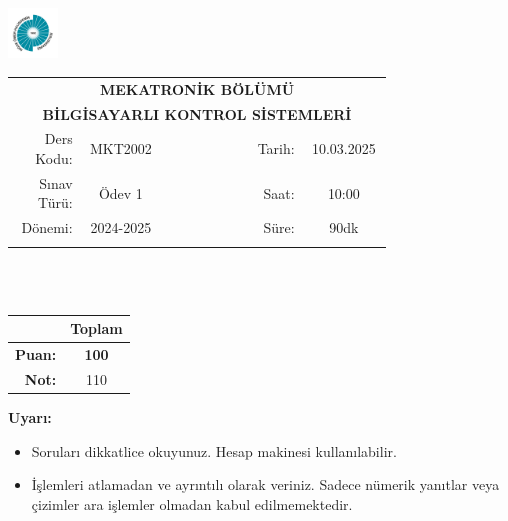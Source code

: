 \newcommand\UniversiteAdi{Niğde Ömer Halisdemir Üniversitesi}
\newcommand\BolumAdi{MEKATRONİK BÖLÜMÜ}
\newcommand\DersKodu{MKT2002}
\newcommand\DersAdi{BİLGİSAYARLI KONTROL SİSTEMLERİ}
\newcommand\SinavAdi{Ödev 1}
\newcommand\SinavTarihi{10.03.2025}
\newcommand\SinavSaati{10:00}
\newcommand\SinavSuresi{90dk}

\pagestyle{fancy}
\fancyhf{} %
\noindent \includegraphics[width=0.1\textwidth]{logo}
\begin{tabular}{
    p{0.15\linewidth}
    p{0.15\linewidth}
    p{0.2\linewidth}
    p{0.1\linewidth}
    p{0.15\linewidth}}
    \multicolumn{5}{c}{\textbf{\BolumAdi}}\\
    \multicolumn{5}{c}{\textbf{\DersAdi}}\\\hline
    \multicolumn{1}{|r|}{Ders Kodu:}&
    \multicolumn{1}{|c|}{\DersKodu}&
    \multicolumn{1}{|c|}{}& 
    \multicolumn{1}{|r|}{Tarih:}&
    \multicolumn{1}{|c|}{\SinavTarihi} \\\hline
    \multicolumn{1}{|r|}{Sınav Türü:}&
    \multicolumn{1}{|c|}{\SinavAdi}&  
    \multicolumn{1}{|c|}{}&
    \multicolumn{1}{|r|}{Saat:}&
    \multicolumn{1}{|c|}{\SinavSaati}\\\hline
    \multicolumn{1}{|r|}{Dönemi:}&
    \multicolumn{1}{|c|}{2024-2025}&
    \multicolumn{1}{|c|}{}&
    \multicolumn{1}{|r|}{Süre:}&
    \multicolumn{1}{|c|}{\SinavSuresi} \\\hline
    &&&&\\
\end{tabular}\\\\
\noindent\begin{center}
\begin{tabular}{|r|c|}\hline
    &\textbf{Toplam}\\\hline
    \textbf{Puan:} &\textbf{100}\\\hline
    \textbf{Not:}  &110\\\hline
\end{tabular}\end{center}
\noindent\textbf{Uyarı:}
\begin{itemize}\bfseries
    \item Soruları dikkatlice okuyunuz. Hesap makinesi kullanılabilir.
    \item İşlemleri atlamadan ve ayrıntılı olarak veriniz. Sadece nümerik yanıtlar veya çizimler ara işlemler olmadan kabul edilmemektedir.
\end{itemize}
